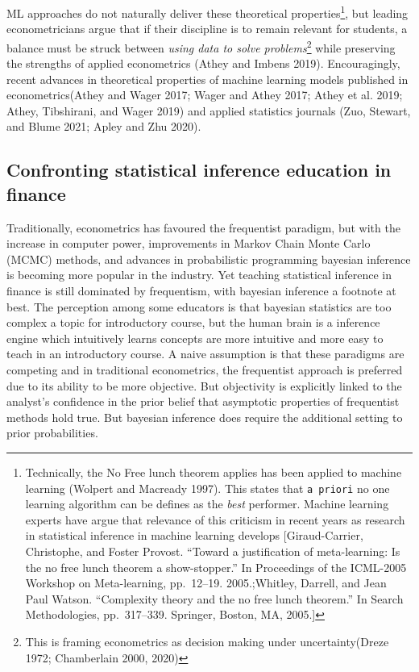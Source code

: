 \documentclass{article}
\begin{document}
ML approaches do not naturally deliver these theoretical
properties\footnote{Technically, the No Free lunch theorem applies has
  been applied to machine learning (Wolpert and Macready 1997). This
  states that \texttt{a\ priori} no one learning algorithm can be
  defines as the \emph{best} performer. Machine learning experts have
  argue that relevance of this criticism in recent years as research in
  statistical inference in machine learning develops {[}Giraud-Carrier,
  Christophe, and Foster Provost. ``Toward a justification of
  meta-learning: Is the no free lunch theorem a show-stopper.'' In
  Proceedings of the ICML-2005 Workshop on Meta-learning, pp.~12--19.
  2005.;Whitley, Darrell, and Jean Paul Watson. ``Complexity theory and
  the no free lunch theorem.'' In Search Methodologies, pp.~317--339.
  Springer, Boston, MA, 2005.{]}}, but leading econometricians argue
that if their discipline is to remain relevant for students, a balance
must be struck between \emph{using data to solve problems}\footnote{This
  is framing econometrics as decision making under uncertainty(Dreze
  1972; Chamberlain 2000, 2020)} while preserving the strengths of
applied econometrics (Athey and Imbens 2019). Encouragingly, recent
advances in theoretical properties of machine learning models published
in econometrics(Athey and Wager 2017; Wager and Athey 2017; Athey et al.
2019; Athey, Tibshirani, and Wager 2019) and applied statistics journals
(Zuo, Stewart, and Blume 2021; Apley and Zhu 2020).

\hypertarget{confronting-statistical-inference-education-in-finance}{%
\subsection{Confronting statistical inference education in
finance}\label{confronting-statistical-inference-education-in-finance}}

Traditionally, econometrics has favoured the frequentist paradigm, but
with the increase in computer power, improvements in Markov Chain Monte
Carlo (MCMC) methods, and advances in probabilistic programming bayesian
inference is becoming more popular in the industry. Yet teaching
statistical inference in finance is still dominated by frequentism, with
bayesian inference a footnote at best. The perception among some
educators is that bayesian statistics are too complex a topic for
introductory course, but the human brain is a inference engine which
intuitively learns concepts are more intuitive and more easy to teach in
an introductory course. A naive assumption is that these paradigms are
competing and in traditional econometrics, the frequentist approach is
preferred due to its ability to be more objective. But objectivity is
explicitly linked to the analyst's confidence in the prior belief that
asymptotic properties of frequentist methods hold true. But bayesian
inference does require the additional setting to prior probabilities.
\end{document}
